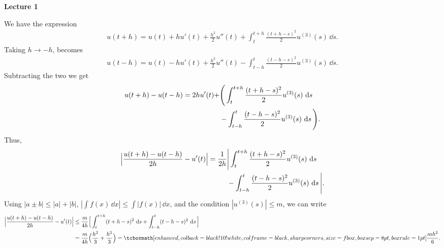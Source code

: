 \def\duedate{08/31/2022}
\def\HWnum{1}



    
\textbf{\large Lecture 1}


We have the expression
\begin{eqnarray}
    \label{eq:u(t+h)}
    u(t+h) = u(t) + hu'(t) + \frac{h^2}{2}u''(t) + \int_{t}^{t+h} \frac{(t+h-s)^{2}}{2} u^{(3)}(s)\,\dd{s}
.\end{eqnarray}
Taking $h \rightarrow -h$,  becomes
\begin{eqnarray}
    \label{eq:u(t-h)}
    u(t-h) = u(t) - hu'(t) + \frac{h^2}{2}u''(t) - \int_{t-h}^{t} \frac{(t-h-s)^{2}}{2} u^{(3)}(s)\,\dd{s}
.\end{eqnarray}
Subtracting the two we get
\begin{align}
    \label{eq:subtract}
    u(t+h) - u(t-h) = 2hu'(t) + &\Bigg( \int_{t}^{t+h} \frac{(t+h-s)^{2}}{2} u^{(3)}(s)\,\dd{s} \notag \\
                                &- \int_{t-h}^{t} \frac{(t-h-s)^{2}}{2} u^{(3)}(s)\,\dd{s} \Bigg)
.\end{align}
Thus,
\begin{align}
    \label{eq:abs-value-expr}
    \Big| \frac{u(t+h) - u(t-h)}{2h} - u'(t) \Big| = \frac{1}{2h}&\Bigg| \int_{t}^{t+h} \frac{(t+h-s)^{2}}{2} u^{(3)}(s)\,\dd{s} \notag \\
    &- \int_{t-h}^{t} \frac{(t-h-s)^{2}}{2} u^{(3)}(s)\,\dd{s} \Bigg|
.\end{align}
Using $|a \pm b| \leq |a| + |b|$, $|\int f(x) \, \dd{x}| \leq \int |f(x)|\,\dd{x}$, and the condition $|u^{(3)}(s)| \leq m$, we can write
\begin{align}
    \Big| \frac{u(t+h) - u(t-h)}{2h} - u'(t) \Big| &\leq \frac{m}{4h}\Big[\int_{t}^{t+h} (t+h-s)^{2}\, \dd{s} + \int_{t-h}^{t} (t-h-s)^2\, \dd{s} \Big] \notag \\
                                                   &= \frac{m}{4h}\Big( \frac{h^3}{3} + \frac{h^3}{3} \Big) = \eqbox{\frac{mh^2}{6}}
.\end{align}


